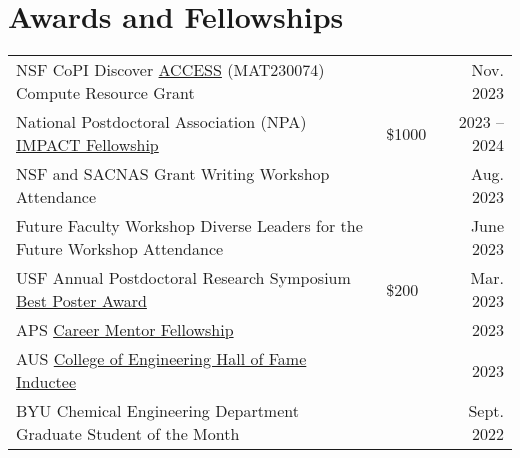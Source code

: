 \documentclass[letterpaper,11pt]{article}
\begin{document}
\section*{Awards and Fellowships}
\vspace{-0.8\baselineskip}
\begin{longtable}{@{}p{} p{} r@{}}
  NSF CoPI Discover \href{https://access-ci.org/}{ACCESS} (MAT230074) Compute Resource Grant                                                                                                                                          &         & Nov. 2023    \\[3pt]
  National Postdoctoral Association (NPA) \href{https://www.nationalpostdoc.org/general/custom.asp?page=IMPACTProgram}{IMPACT Fellowship}                                                                                             & \$1000  & 2023 -- 2024 \\[3pt]
  NSF and SACNAS Grant Writing Workshop Attendance                                                                                                                                                                                    &         & Aug. 2023    \\[3pt]
  Future Faculty Workshop Diverse Leaders for the Future Workshop Attendance                                                                                                                                                          &         & June 2023    \\[3pt]
  USF Annual Postdoctoral Research Symposium \href{https://www.usf.edu/postdoctoral-affairs/postdoc-services/postdoc-spotlight.aspx#:~:text=BEST\%20POSTERS\%3A-,Pierre\%20Kawak,-Exploring\%20Mechanisms\%20of}{Best Poster Award}   & \$200   & Mar. 2023    \\[3pt]
  APS \href{https://www.aps.org/careers/guidance/mentoring.cfm}{Career Mentor Fellowship}                                                                                                                                             &         & 2023         \\[3pt]
  AUS \href{https://www.aus.edu/cen/alumni-hall-of-fame#:~:text=of\%20Technology\%20Sydney-,Dr.\%20Pierre\%20Kawak\%C2\%A0,-BS\%27\%2015\%20\%2D\%20Chemical}{College of Engineering Hall of Fame Inductee}                           &         & 2023         \\[3pt]
  BYU Chemical Engineering Department Graduate Student of the Month                                                                                                                                                                   &         & Sept. 2022   \\[3pt]

\end{longtable}
\end{document}
